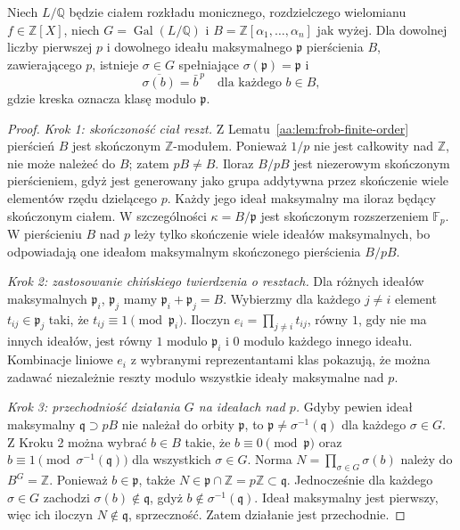 \begin{lemat}
\label{aa:lem:frob-lift}
Niech $L/\mathbb Q$ będzie ciałem rozkładu monicznego,
rozdzielczego wielomianu $f\in\mathbb Z[X]$, niech
$G=\operatorname{Gal}(L/\mathbb Q)$ i
$B=\mathbb Z[\alpha_1,\ldots,\alpha_n]$ jak wyżej.
Dla dowolnej liczby pierwszej $p$ i dowolnego ideału
maksymalnego $\mathfrak p$ pierścienia $B$, zawierającego $p$,
istnieje $\sigma\in G$ spełniające
$\sigma(\mathfrak p)=\mathfrak p$ i
\[
 \overline{\sigma(b)}=\bar b^{\,p}
 \quad\text{dla każdego }b\in B,
\]
gdzie kreska oznacza klasę modulo $\mathfrak p$.
\end{lemat}
\begin{proof}
\emph{Krok 1: skończoność ciał reszt.}
Z Lematu~\ref{aa:lem:frob-finite-order} pierścień $B$
jest skończonym $\mathbb Z$-modułem. Ponieważ $1/p$ nie jest
całkowity nad $\mathbb Z$, nie może należeć do $B$;
zatem $pB\ne B$. Iloraz $B/pB$ jest niezerowym skończonym
pierścieniem, gdyż jest generowany jako grupa addytywna
przez skończenie wiele elementów rzędu dzielącego $p$.
Każdy jego ideał maksymalny ma iloraz będący skończonym
ciałem. W szczególności
$\kappa=B/\mathfrak p$ jest skończonym rozszerzeniem $\mathbb F_p$.
W pierścieniu $B$ nad $p$ leży tylko skończenie wiele
ideałów maksymalnych,
bo odpowiadają one ideałom maksymalnym skończonego pierścienia
$B/pB$.

\emph{Krok 2: zastosowanie chińskiego twierdzenia o resztach.}
Dla różnych ideałów maksymalnych $\mathfrak p_i$, $\mathfrak p_j$
mamy $\mathfrak p_i+\mathfrak p_j=B$.
Wybierzmy dla każdego $j\ne i$ element $t_{ij}\in\mathfrak p_j$
taki, że $t_{ij}\equiv1\pmod{\mathfrak p_i}$.
Iloczyn $e_i=\prod_{j\ne i}t_{ij}$, równy $1$, gdy nie ma
innych ideałów, jest równy $1$ modulo $\mathfrak p_i$
i $0$ modulo każdego innego ideału.
Kombinacje liniowe $e_i$ z wybranymi reprezentantami klas
pokazują, że można zadawać niezależnie reszty modulo wszystkie
ideały maksymalne nad $p$.

\emph{Krok 3: przechodniość działania $G$ na ideałach nad $p$.}
Gdyby pewien ideał maksymalny $\mathfrak q\supset pB$
nie należał do orbity $\mathfrak p$, to
$\mathfrak p\ne\sigma^{-1}(\mathfrak q)$ dla każdego $\sigma\in G$.
Z Kroku 2 można wybrać $b\in B$ takie, że
$b\equiv0\pmod{\mathfrak p}$ oraz
$b\equiv1\pmod{\sigma^{-1}(\mathfrak q)}$
dla wszystkich $\sigma\in G$.
Norma $N=\prod_{\sigma\in G}\sigma(b)$ należy do
$B^G=\mathbb Z$. Ponieważ $b\in\mathfrak p$, także
$N\in\mathfrak p\cap\mathbb Z=p\mathbb Z\subset\mathfrak q$.
Jednocześnie dla każdego $\sigma\in G$ zachodzi
$\sigma(b)\notin\mathfrak q$, gdyż
$b\notin\sigma^{-1}(\mathfrak q)$.
Ideał maksymalny jest pierwszy, więc ich iloczyn
$N\notin\mathfrak q$, sprzeczność. Zatem działanie jest przechodnie.


\end{proof}
